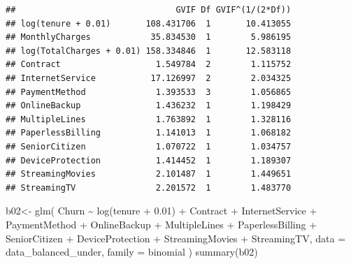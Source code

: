 \documentclass[
  twoside]{article}
\newenvironment{Shaded}{\begin{snugshade}}{\end{snugshade}}
\newcommand{\AttributeTok}[1]{\textcolor[rgb]{0.77,0.63,0.00}{#1}}
\newcommand{\FloatTok}[1]{\textcolor[rgb]{0.00,0.00,0.81}{#1}}
\newcommand{\FunctionTok}[1]{\textcolor[rgb]{0.00,0.00,0.00}{#1}}
\newcommand{\NormalTok}[1]{#1}
\newcommand{\OtherTok}[1]{\textcolor[rgb]{0.56,0.35,0.01}{#1}}
\newcommand{\SpecialCharTok}[1]{\textcolor[rgb]{0.00,0.00,0.00}{#1}}
\begin{document}
\begin{verbatim}
##                                GVIF Df GVIF^(1/(2*Df))
## log(tenure + 0.01)       108.431706  1       10.413055
## MonthlyCharges            35.834530  1        5.986195
## log(TotalCharges + 0.01) 158.334846  1       12.583118
## Contract                   1.549784  2        1.115752
## InternetService           17.126997  2        2.034325
## PaymentMethod              1.393533  3        1.056865
## OnlineBackup               1.436232  1        1.198429
## MultipleLines              1.763892  1        1.328116
## PaperlessBilling           1.141013  1        1.068182
## SeniorCitizen              1.070722  1        1.034757
## DeviceProtection           1.414452  1        1.189307
## StreamingMovies            2.101487  1        1.449651
## StreamingTV                2.201572  1        1.483770
\end{verbatim}

\begin{Shaded}
\begin{Highlighting}[]
\NormalTok{b02}\OtherTok{\textless{}{-}} \FunctionTok{glm}\NormalTok{(}
\NormalTok{  Churn }\SpecialCharTok{\textasciitilde{}} \FunctionTok{log}\NormalTok{(tenure }\SpecialCharTok{+} \FloatTok{0.01}\NormalTok{)}
  \SpecialCharTok{+}\NormalTok{ Contract  }\SpecialCharTok{+}\NormalTok{ InternetService }\SpecialCharTok{+}\NormalTok{ PaymentMethod }
  \SpecialCharTok{+}\NormalTok{ OnlineBackup }\SpecialCharTok{+}\NormalTok{ MultipleLines }\SpecialCharTok{+}\NormalTok{ PaperlessBilling }\SpecialCharTok{+}\NormalTok{ SeniorCitizen  }
  \SpecialCharTok{+}\NormalTok{ DeviceProtection }\SpecialCharTok{+}\NormalTok{ StreamingMovies }\SpecialCharTok{+}\NormalTok{ StreamingTV,}
  \AttributeTok{data =}\NormalTok{ data\_balanced\_under,}
  \AttributeTok{family =}\NormalTok{ binomial}
\NormalTok{)}
\FunctionTok{summary}\NormalTok{(b02)}
\end{Highlighting}
\end{Shaded}
\end{document}
